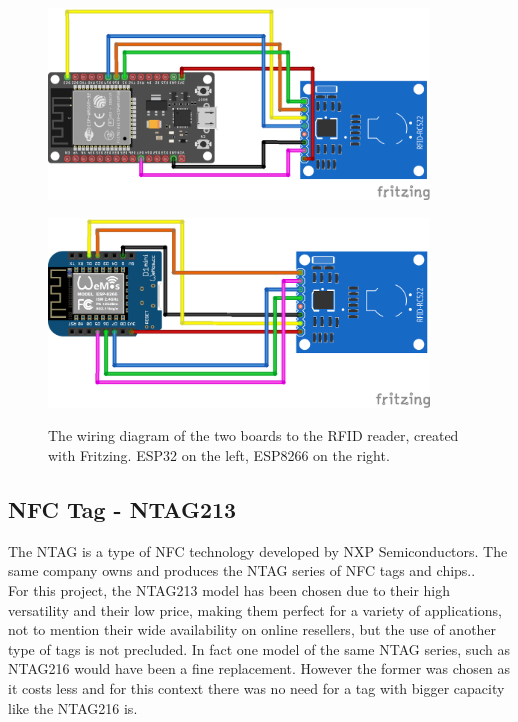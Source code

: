 \documentclass[target=bach,aauheader=,style=]{thud}
\begin{document}
\begin{figure}[h]
	\centering
	\begin{minipage}{0.5\textwidth}
		\centering
		\includegraphics[width=0.9\textwidth]{esp32_mfrc522} %
		\label{fig:esp32_mfrc522}
	\end{minipage}\hfill
	\begin{minipage}{0.5\textwidth}
		\centering
		\includegraphics[width=0.9\textwidth]{esp8266_mfrc522} %
		\label{fig:esp8266_mfrc522}
	\end{minipage}
	\caption{The wiring diagram of the two boards to the RFID reader, created with Fritzing. ESP32 on the left, ESP8266 on the right.}
\end{figure}

\subsection{NFC Tag - NTAG213}

The NTAG is a type of NFC technology developed by NXP Semiconductors. The same company owns and produces the NTAG series of NFC tags and chips..\\
For this project, the NTAG213 \cite{ntag213} model has been chosen due to their high versatility and their low price, making them perfect for a variety of applications, not to mention their wide availability on online resellers, but the use of another type of tags is not precluded. In fact one model of the same NTAG series, such as NTAG216 would have been a fine replacement. However the former was chosen as it costs less and for this context there was no need for a tag with bigger capacity like the NTAG216 is.
\end{document}
